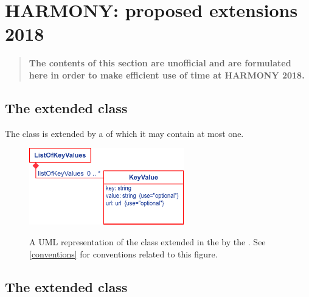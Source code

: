 
\newpage
\section{HARMONY: proposed extensions 2018}

\begin{quote}
 \textbf{\Large The contents of this section are unofficial and are formulated here in order to make efficient use of time at HARMONY 2018.}
\end{quote}

\subsection{The extended  class}
\label{sbase-class-kv}

The \SBML \SBase class is extended by a  of which it may contain at most one.
%
\begin{figure}[ht]
  \centering
  \includegraphics[width=0.6\textwidth]{images/fbc_v3_uml_keyvalue.pdf}\\
  \caption{A UML representation of the \SBML \SBase class extended in
  the \FBCPackage by the \ListOfKeyValues. See \ref{conventions} for conventions related to this
  figure.}
  \label{fig:fbc_v3_uml_keyvalue}
\end{figure}


\subsection{The extended  class}
\label{model-class-kv}

